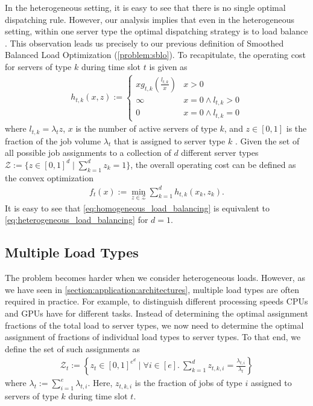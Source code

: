 In the heterogeneous setting, it is easy to see that there is no single optimal dispatching rule. However, our analysis implies that even in the heterogeneous setting, within one server type the optimal dispatching strategy is to load balance \cite{Albers2021_2}. This observation leads us precisely to our previous definition of Smoothed Balanced Load Optimization (\autoref{problem:sblo}). To recapitulate, the operating cost for servers of type $k$ during time slot $t$ is given as \begin{align}\label{eq:heterogeneous_load_balancing_unit}
    h_{t,k}(x,z) := \begin{cases} 
        x g_{t,k}\left(\frac{l_{t,k}}{x}\right) & x > 0 \\
        \infty                                  & x = 0 \land l_{t,k} > 0 \\
        0                                       & x = 0 \land l_{t,k} = 0
    \end{cases}
\end{align} where $l_{t,k} = \lambda_t z$, $x$ is the number of active servers of type $k$, and $z \in [0,1]$ is the fraction of the job volume $\lambda_t$ that is assigned to server type $k$ \cite{Albers2021_2}. Given the set of all possible job assignments to a collection of $d$ different server types $\mathcal{Z} := \{z \in [0,1]^d \mid \sum_{k=1}^d z_k = 1\}$, the overall operating cost can be defined as the convex optimization \begin{align}\label{eq:heterogeneous_load_balancing}
    f_t(x) := \min_{z \in \mathcal{Z}} \sum_{k=1}^d h_{t,k}(x_k,z_k).
\end{align} It is easy to see that \autoref{eq:homogeneous_load_balancing} is equivalent to \autoref{eq:heterogeneous_load_balancing} for $d = 1$.

\subsection{Multiple Load Types}\label{section:application:dispatching:multiple_load_types}

The problem becomes harder when we consider heterogeneous loads. However, as we have seen in \autoref{section:application:architectures}, multiple load types are often required in practice. For example, to distinguish different processing speeds CPUs and GPUs have for different tasks. Instead of determining the optimal assignment fractions of the total load to server types, we now need to determine the optimal assignment of fractions of individual load types to server types. To that end, we define the set of such assignments as \begin{align*}
    \mathcal{Z}_t := \left\{z_t \in [0,1]^{e^d} \mid \forall i \in [e].\ \sum_{k=1}^d z_{t,k,i} = \frac{\lambda_{t,i}}{\lambda_t}\right\}
\end{align*} where $\lambda_t := \sum_{i=1}^e \lambda_{t,i}$. Here, $z_{t,k,i}$ is the fraction of jobs of type $i$ assigned to servers of type $k$ during time slot $t$.

